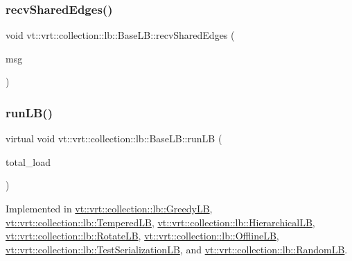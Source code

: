 \subsubsection{\texorpdfstring{recv\+Shared\+Edges()}{recvSharedEdges()}}
{\footnotesize\ttfamily void vt\+::vrt\+::collection\+::lb\+::\+Base\+L\+B\+::recv\+Shared\+Edges (\begin{DoxyParamCaption}\item[{\hyperlink{structvt_1_1vrt_1_1collection_1_1lb_1_1_comm_msg}{Comm\+Msg} $\ast$}]{msg }\end{DoxyParamCaption})}

\mbox{\label{structvt_1_1vrt_1_1collection_1_1lb_1_1_base_l_b_aa957038bb132ac29fb61535487f0604f}} 
\subsubsection{\texorpdfstring{run\+L\+B()}{runLB()}}
{\footnotesize\ttfamily virtual void vt\+::vrt\+::collection\+::lb\+::\+Base\+L\+B\+::run\+LB (\begin{DoxyParamCaption}\item[{\hyperlink{namespacevt_a8fb51741340b87d7aaee0bef60e9896b}{Load\+Type}}]{total\+\_\+load }\end{DoxyParamCaption})\hspace{0.3cm}{\ttfamily [pure virtual]}}



Implemented in \hyperlink{structvt_1_1vrt_1_1collection_1_1lb_1_1_greedy_l_b_abe03de3d4ee3b1259707a9d5b22a7b9c}{vt\+::vrt\+::collection\+::lb\+::\+Greedy\+LB}, \hyperlink{structvt_1_1vrt_1_1collection_1_1lb_1_1_tempered_l_b_ace1513a46b9b5c195648262c5cc48783}{vt\+::vrt\+::collection\+::lb\+::\+Tempered\+LB}, \hyperlink{structvt_1_1vrt_1_1collection_1_1lb_1_1_hierarchical_l_b_a4abe2f02571b4495033e70e75ca67afe}{vt\+::vrt\+::collection\+::lb\+::\+Hierarchical\+LB}, \hyperlink{structvt_1_1vrt_1_1collection_1_1lb_1_1_rotate_l_b_a3266fa43e0459b57466d9e184aeae2f7}{vt\+::vrt\+::collection\+::lb\+::\+Rotate\+LB}, \hyperlink{structvt_1_1vrt_1_1collection_1_1lb_1_1_offline_l_b_ad6b473ed506c50b86e308fc9840a11d7}{vt\+::vrt\+::collection\+::lb\+::\+Offline\+LB}, \hyperlink{structvt_1_1vrt_1_1collection_1_1lb_1_1_test_serialization_l_b_afb9f6848d8ea2432e2121a32aee56d54}{vt\+::vrt\+::collection\+::lb\+::\+Test\+Serialization\+LB}, and \hyperlink{structvt_1_1vrt_1_1collection_1_1lb_1_1_random_l_b_a9cf59256d2c69208326310f3f8dcd3e8}{vt\+::vrt\+::collection\+::lb\+::\+Random\+LB}.

